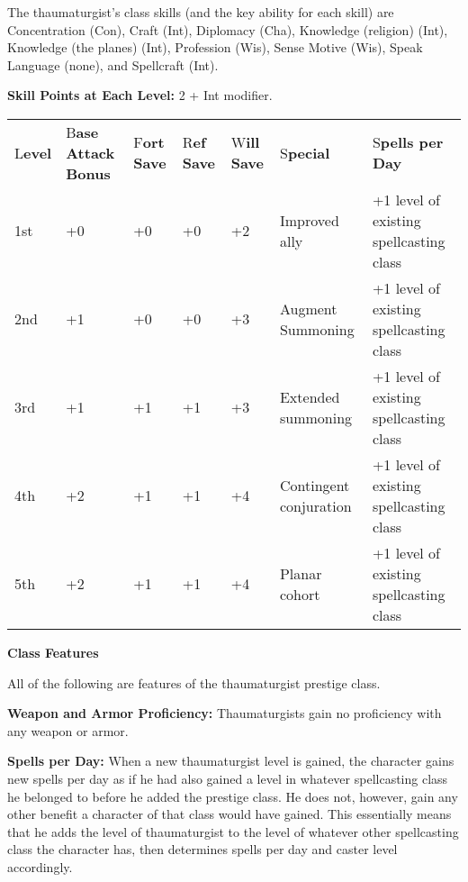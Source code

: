 \documentclass{article}
\begin{document}
The thaumaturgist's class skills (and the key ability for each skill) are Concentration 
(Con), Craft (Int), Diplomacy (Cha), Knowledge (religion) (Int), Knowledge (the 
planes) (Int), Profession (Wis), Sense Motive (Wis), Speak Language (none), and 
Spellcraft (Int). 

\parindent=3pt
\textbf{Skill Points at Each Level:} 2 + Int modifier.

\vspace{12pt}
\parindent=0pt
\begin{tabular}{|>{\raggedright}p{20pt}|>{\raggedright}p{23pt}|>{\raggedright}p{16pt}|>{\raggedright}p{16pt}|>{\raggedright}p{16pt}|>{\raggedright}p{67pt}|>{\raggedright}p{106pt}|}
\hline
\multicolumn{7}{|p{266pt}|}{T\textbf{able: The Thaumaturgist}}\tabularnewline
\hline
L\textbf{evel} & B\textbf{ase}\linebreak{}
\textbf{Attack}\linebreak{}
\textbf{Bonus} & F\textbf{ort}\linebreak{}
\textbf{Save} & R\textbf{ef}\linebreak{}
\textbf{Save} & W\textbf{ill}\linebreak{}
\textbf{Save} & S\textbf{pecial} & S\textbf{pells per Day}\tabularnewline
\hline
1st & +0 & +0 & +0 & +2 & Improved ally & +1 level of existing spellcasting class\tabularnewline
\hline
2nd & +1 & +0 & +0 & +3 & Augment Summoning & +1 level of existing spellcasting 
class\tabularnewline
\hline
3rd & +1 & +1 & +1 & +3 & Extended summoning & +1 level of existing spellcasting 
class\tabularnewline
\hline
4th & +2 & +1 & +1 & +4 & Contingent conjuration & +1 level of existing spellcasting 
class\tabularnewline
\hline
5th & +2 & +1 & +1 & +4 & Planar cohort & +1 level of existing spellcasting class\tabularnewline
\hline
\end{tabular}

\vspace{12pt}
\textbf{Class Features}

All of the following are features of the thaumaturgist prestige class.

\textbf{Weapon and Armor Proficiency:} Thaumaturgists gain no proficiency with 
any weapon or armor.

\textbf{Spells per Day: }When a new thaumaturgist level is gained, the character 
gains new spells per day as if he had also gained a level in whatever spellcasting 
class he belonged to before he added the prestige class. He does not, however, 
gain any other benefit a character of that class would have gained. This essentially 
means that he adds the level of thaumaturgist to the level of whatever other spellcasting 
class the character has, then determines spells per day and caster level accordingly.
\end{document}
